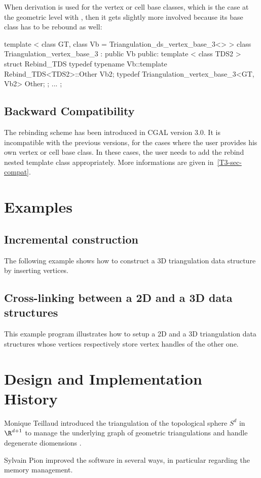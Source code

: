 When derivation is used for the vertex or cell base classes, which is the
case at the geometric level with , then
it gets slightly more involved because its base class has to be rebound as
well:

\begin{ccExampleCode}
template < class GT, class Vb = Triangulation_ds_vertex_base_3<> >
class Triangulation_vertex_base_3 : public Vb
{
public:
  template < class TDS2 >
  struct Rebind_TDS {
    typedef typename Vb::template Rebind_TDS<TDS2>::Other  Vb2;
    typedef Triangulation_vertex_base_3<GT, Vb2>           Other;
  };
...
};
\end{ccExampleCode}

\subsection{Backward Compatibility}
The rebinding scheme has been introduced in CGAL version 3.0.  It is
incompatible with the previous versions, for the cases where the user provides
his own vertex or cell base class.  In these cases, the user needs to add
the rebind nested template class appropriately.  More informations are given
in~\ref{T3-sec-compat}.

\section{Examples}
\label{TDS3-sec-examples}

\subsection{Incremental construction}
The following example shows how to construct a 3D triangulation data
structure by inserting vertices.


\subsection{Cross-linking between a 2D and a 3D data structures}
This example program illustrates how to setup a 2D and a 3D triangulation data
structures whose vertices respectively store vertex handles of the other one.


\section{Design and Implementation History}

Monique Teillaud introduced the triangulation of the topological
sphere $S^d$ in $\R^{d+1}$ to manage the underlying graph of geometric
triangulations and handle degenerate diomensions \cite{t-tdtc-99}. 

Sylvain Pion improved the software in several ways, in particular
regarding the memory management.
